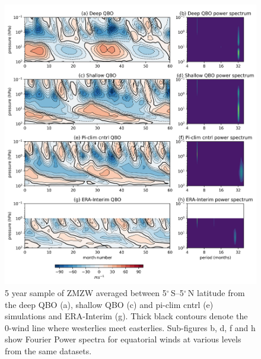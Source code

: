 \begin{figure}[h!]
\begin{center}
\noindent\includegraphics[width = \linewidth]{Figures/Figures-deepQBO/experiment_QBOs.png}
\caption[Equatorial ZMZW time-height profiles from QBO experiments]{5 year sample of ZMZW averaged between 5$^{\circ}$\,S--5$^{\circ}$\,N latitude from the deep QBO (a), shallow QBO (c) and pi-clim cntrl (e) simulations and ERA-Interim (g). Thick black contours denote the 0-wind line where westerlies meet easterlies. Sub-figures b, d, f and h show Fourier Power spectra for equatorial winds at various levels from the same datasets.}
\label{fig:experiment_QBOs}
\end{center}
\end{figure}

